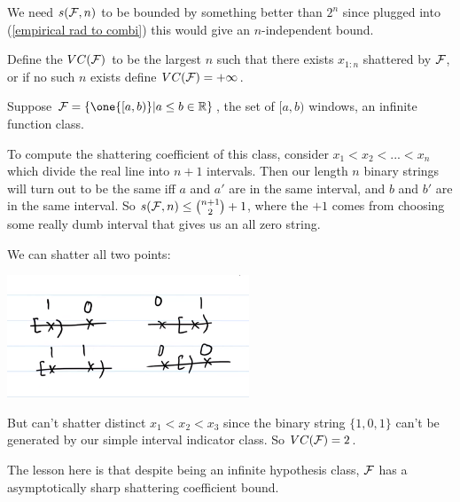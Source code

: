 \documentclass[11pt]{scrartcl}
\begin{document}
We need $s(\mathcal{F}, n)$ to be bounded by something better than $2^n$ since plugged into (\ref{empirical rad to combi}) this would give an $n$-independent bound.

\begin{definition}
Define the  $VC(\mathcal{F})$ to be the largest $n$ such that there exists $x_{1:n}$ shattered by $\mathcal{F}$, or if no such $n$ exists define $VC(\mathcal{F}) = + \infty$.
\end{definition}


\begin{example}
[Shattering coefficient bound and VC dimension where $|\H| = \infty$]
Suppose $\F = \{\one{[a,b)} | a \le b \in \RR\}$, the set of $[a,b)$ windows, an infinite function class.

To compute the shattering coefficient of this class, consider $x_1 < x_2 < ... < x_n$ which divide the real line into $n+1$ intervals. Then our length $n$ binary strings will turn out to be the same iff $a$ and $a'$ are in the same interval, and $b$ and $b'$ are in the same interval. So $s(\mathcal{F}, n) \le \binom{n+1}{2} + 1$, where the $+1$ comes from choosing some really dumb interval that gives us an all zero string.

We can shatter all two points:

\begin{center}
\includegraphics[scale=0.5]{bin strings.png}
    \label{fig:bin strings}
\end{center}

But can't shatter distinct $x_1 < x_2 < x_3$ since the binary string $\{ 1, 0, 1 \}$ can't be generated by our simple interval indicator class. So $VC(\mathcal{F})=2$.

The lesson here is that despite being an infinite hypothesis class, $\mathcal{F}$ has a asymptotically sharp shattering coefficient bound.
\end{example}
\end{document}
